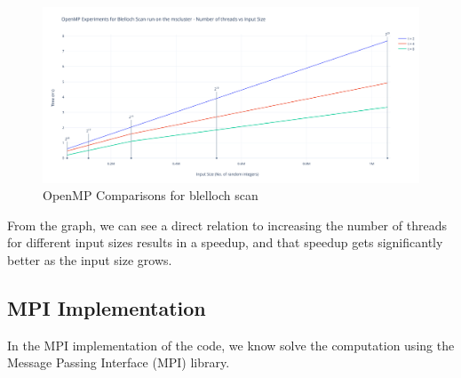 \begin{figure}[htb]
	\centering
	\includegraphics[width=0.8\linewidth]{pics/ompScan.png}
    	\caption{OpenMP Comparisons for blelloch scan}\label{fig:ompScan}
\end{figure}

From the graph, we can see a direct relation to increasing the number of threads for different input sizes results in a speedup, and that speedup gets significantly better as the input size grows.

\subsection{MPI Implementation}
In the MPI \cite{mpi} implementation of the code, we know solve the computation using the Message Passing Interface (MPI) library.

